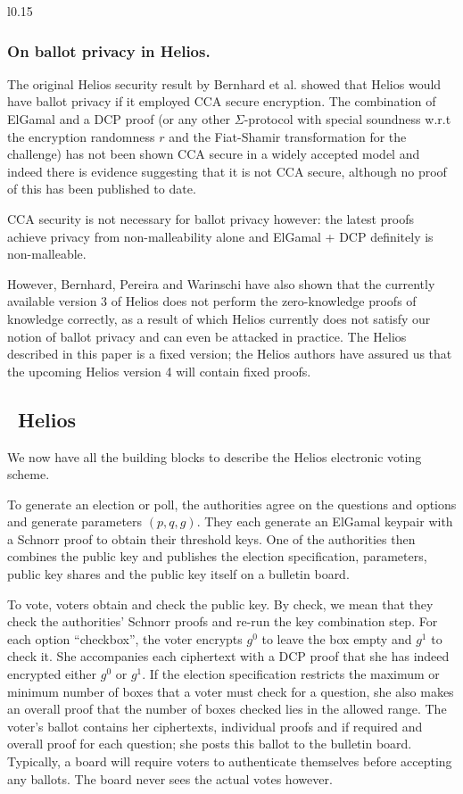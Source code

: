 \documentclass[envcountsame]{llncs}
\newenvironment{helios}{\begin{framed}
\vspace{-18pt}
\begin{wrapfigure}{l}{0.15\textwidth}
\vspace{-12pt}\quad{\Huge \Sun}
\end{wrapfigure}}{\end{framed}}
\begin{document}
\begin{helios}
\subsubsection{On ballot privacy in Helios.}
The original Helios security result by Bernhard et al. \cite{BCPSW11} showed
that Helios would have ballot privacy if it employed CCA secure encryption.
The combination of ElGamal and a DCP proof (or any other $\Sigma$-protocol with
special soundness w.r.t the encryption randomness $r$ and the Fiat-Shamir
transformation for the challenge) has not been shown CCA secure in a widely
accepted model and indeed there is evidence suggesting that it is not CCA
secure, although no proof of this has been published to date.

CCA security is not necessary for ballot privacy however: the latest proofs
\cite{BPW12a,BPW12b} achieve privacy from non-malleability alone and ElGamal +
DCP definitely is non-malleable.

However, Bernhard, Pereira and Warinschi \cite{BPW12b} have also shown that the
currently available version 3 of Helios does not perform the zero-knowledge
proofs of knowledge correctly, as a result of which Helios currently does not
satisfy our notion of ballot privacy and can even be attacked in practice. The
Helios described in this paper is a fixed version; the Helios authors have
assured us that the upcoming Helios version 4 will contain fixed proofs.
\end{helios}

\subsection{\Sun\ Helios}

We now have all the building blocks to describe the Helios electronic voting
scheme.

To generate an election or poll, the authorities agree on the questions and
options and generate parameters $(p, q, g)$. They each generate an ElGamal
keypair with a Schnorr proof to obtain their threshold keys. One of the
authorities then combines the public key and publishes the election
specification, parameters, public key shares and the public key itself on a
bulletin board.

To vote, voters obtain and check the public key. By check, we mean that they
check the authorities' Schnorr proofs and re-run the key combination step.
For each option ``checkbox'', the voter encrypts $g^0$ to leave the box empty
and $g^1$ to check it. She accompanies each ciphertext with a DCP proof that she
has indeed encrypted either $g^0$ or $g^1$. If the election specification
restricts the maximum or minimum number of boxes that a voter must check for a
question, she also makes an overall proof that the number of boxes checked lies
in the allowed range. The voter's ballot contains her ciphertexts, individual
proofs and if required and overall proof for each question; she posts this
ballot to the bulletin board. Typically, a board will require voters to
authenticate themselves before accepting any ballots. The board never sees the
actual votes however.
\end{document}
